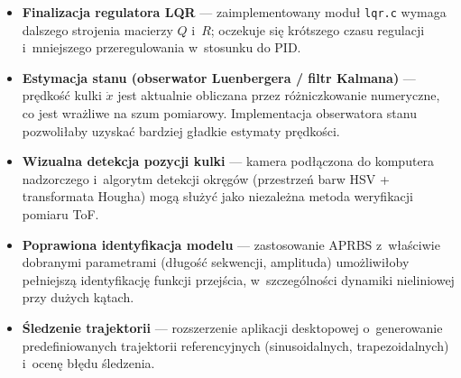 \begin{itemize}
  \item \textbf{Finalizacja regulatora LQR} — zaimplementowany moduł
        \texttt{lqr.c} wymaga dalszego strojenia macierzy $Q$ i~$R$;
        oczekuje się krótszego czasu regulacji i~mniejszego przeregulowania
        w~stosunku do PID.

  \item \textbf{Estymacja stanu (obserwator Luenbergera / filtr Kalmana)} —
        prędkość kulki $\dot{x}$ jest aktualnie obliczana przez różniczkowanie
        numeryczne, co jest wrażliwe na szum pomiarowy.
        Implementacja obserwatora stanu pozwoliłaby uzyskać bardziej
        gładkie estymaty prędkości.

  \item \textbf{Wizualna detekcja pozycji kulki} — kamera podłączona do
        komputera nadzorczego i~algorytm detekcji okręgów (przestrzeń barw
        HSV + transformata Hougha) mogą służyć jako niezależna metoda
        weryfikacji pomiaru ToF.

  \item \textbf{Poprawiona identyfikacja modelu} — zastosowanie APRBS
        z~właściwie dobranymi parametrami (długość sekwencji, amplituda)
        umożliwiłoby pełniejszą identyfikację funkcji przejścia, w~szczególności
        dynamiki nieliniowej przy dużych kątach.

  \item \textbf{Śledzenie trajektorii} — rozszerzenie aplikacji desktopowej
        o~generowanie predefiniowanych trajektorii referencyjnych
        (sinusoidalnych, trapezoidalnych) i~ocenę błędu śledzenia.
\end{itemize}
